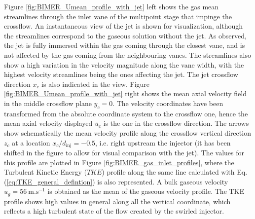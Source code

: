 Figure \ref{fig:BIMER_Umean_profile_with_jet} left shows the gas mean streamlines through the inlet vane of the multipoint stage that impinge the crossflow. An instantaneous view of the jet is shown for visualization, although the streamlines correspond to the gaseous solution without the jet. As observed, the jet is fully immersed within the gas coming through the closest vane, and is not affected by the gas coming from the neighbouring vanes. The streamlines also show a high variation in the velocity magnitude along the vane width, with the highest velocity streamlines being the ones affecting the jet. The jet crossflow direction $x_c$ is also indicated in the view. Figure \ref{fig:BIMER_Umean_profile_with_jet} right shows the mean axial velocity field in the middle crossflow plane $y_c = 0$. The velocity coordinates have been transformed from the absolute coordinate system to the crossflow one, hence the mean axial velocity displayed $\overline{u}_c$ is the one in the crossflow direction. The arrows show schematically the mean velocity profile along the crossflow vertical direction $z_c$ at a location $x_c/d_\mathrm{inj} = -0.5$, i.e. right upstream the injector (it has been shifted in the figure to allow for visual comparison with the jet). The values for this profile are plotted in Figure \ref{fig:BIMER_gas_inlet_profiles}, where the Turbulent Kinetic Energy ($TKE$) profile along the same line calculated with Eq. (\ref{eq:TKE_general_defintion}) is also represented. A bulk gaseous velocity $u_g = 56 ~\mathrm{m}.\mathrm{s}^{-1}$ is obtained as the mean of the gaseous velocity profile. The TKE profile shows high values in general along all the vertical coordinate, which reflects a high turbulent state of the flow created by the swirled injector. %


